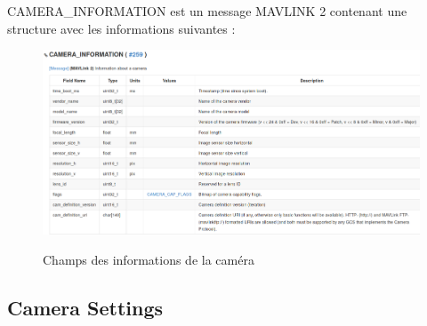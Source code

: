 CAMERA\_INFORMATION est un message MAVLINK 2 contenant une structure avec les informations suivantes : 
\newpage
\begin{figure}[ht]
    \hspace{-2cm}
    {
        \includegraphics[scale=0.39]{img/camra_info_structure.png}
    }
    \caption{Champs des informations de la caméra}
    \label{fig:Camerainfostruct}
\end{figure}
\subsection{Camera Settings}
